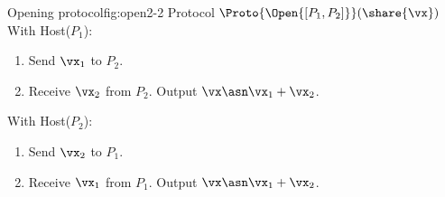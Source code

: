 \begin{Boxfig}{Opening protocol}{fig:open2-2}
  {Protocol $\Proto{\Open{[P_1, P_2]}}(\share{\vx})$}
  With Host($P_1$):
  \begin{enumerate}
    \item Send $\vx_1$ to $P_2$.
    \item Receive $\vx_2$ from $P_2$. Output $\vx \asn \vx_1 + \vx_2$.
  \end{enumerate}
  With Host($P_2$):
  \begin{enumerate}
    \item Send $\vx_2$ to $P_1$.
    \item Receive $\vx_1$ from $P_1$. Output $\vx \asn \vx_1 + \vx_2$.
  \end{enumerate}
\end{Boxfig}







